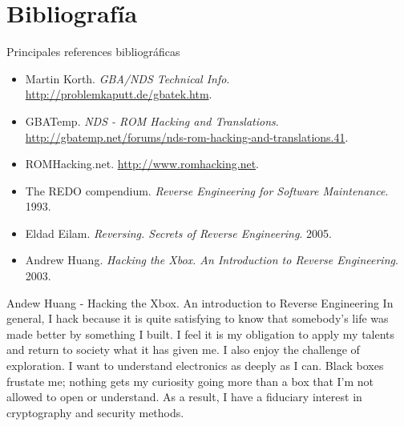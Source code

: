 
\section{Bibliografía}
\begin{frame}{Principales references bibliográficas}
\begin{itemize}
    \item<1-> Martin Korth. \textit{GBA/NDS Technical Info}. {\footnotesize\url{http://problemkaputt.de/gbatek.htm}}.

    \item<2-> GBATemp. \textit{NDS - ROM Hacking and Translations}. {\footnotesize\url{http://gbatemp.net/forums/nds-rom-hacking-and-translations.41}}.

    \item<3-> ROMHacking.net. {\footnotesize\url{http://www.romhacking.net}}.

    \item<4-> The REDO compendium. \textit{Reverse Engineering for Software Maintenance}. 1993.

    \item<5-> Eldad Eilam. \textit{Reversing. Secrets of Reverse Engineering}. 2005.

    \item<6-> Andrew Huang. \textit{Hacking the Xbox. An Introduction to Reverse Engineering}. 2003.
\end{itemize}
\end{frame}

\begin{frame}
    \begin{alertblock}{Andew Huang - Hacking the Xbox. An introduction to Reverse Engineering}
        In general, I hack because it is quite satisfying to know that somebody's life was made better by something I built. I feel it is my obligation to apply my talents and return to society what it has given me. I also enjoy the challenge of exploration. I want to understand electronics as deeply as I can. Black boxes frustate me; nothing gets my curiosity going more than a box that I'm not allowed to open or understand. As a result, I have a fiduciary interest in cryptography and security methods.
    \end{alertblock}
\end{frame}
